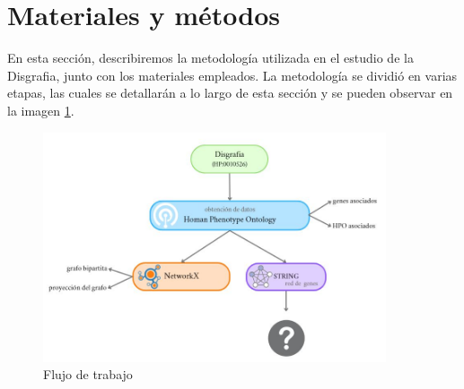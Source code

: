 \section{Materiales y métodos}

En esta sección, describiremos la metodología utilizada en el estudio de la Disgrafia,
junto con los materiales empleados. La metodología se dividió en varias etapas, las
cuales se detallarán a lo largo de esta sección y se pueden observar en la imagen \ref{fig:workflow}.

\begin{figure}[h!]
	\includegraphics[width=0.9\textwidth]{figures/workflow.JPG}
	\caption{Flujo de trabajo}
	\label{fig:workflow}
\end{figure}